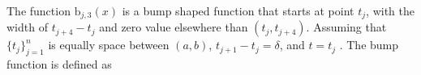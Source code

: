 \documentclass{iitthesis}
\theoremstyle{definition}
\theoremstyle{remark}
\begin{document}
The function $\text{b}_{j,3}(x)$ is a bump shaped function that starts at point $t_j$, with the width of $t_{j+4}-t_{j}$ and zero value elsewhere than $(t_{j}, t_{j+4})$. Assuming that $\{t_{j}\}_{j=1}^{n}$ is equally space between $(a,b)$, $t_{j+1}-t_{j}=\delta$, and $t=t_{j}$ . The bump function is defined as
\end{document}
